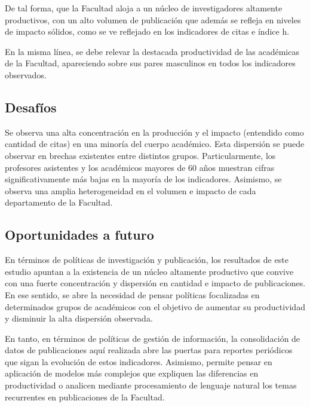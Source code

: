 \documentclass[
  spanish,
  a4paper,
  oneside]{scrbook}
\begin{document}
De tal forma, que la Facultad aloja a un núcleo de investigadores
altamente productivos, con un alto volumen de publicación que además se
refleja en niveles de impacto sólidos, como se ve reflejado en los
indicadores de citas e índice h.

En la misma línea, se debe relevar la destacada productividad de las
académicas de la Facultad, apareciendo sobre sus pares masculinos en
todos los indicadores observados.

\subsection*{Desafíos}\label{desafuxedos}

Se observa una alta concentración en la producción y el impacto
(entendido como cantidad de citas) en una minoría del cuerpo académico.
Esta dispersión se puede observar en brechas existentes entre distintos
grupos. Particularmente, los profesores asistentes y los académicos
mayores de 60 años muestran cifras significativamente más bajas en la
mayoría de los indicadores. Asimismo, se observa una amplia
heterogeneidad en el volumen e impacto de cada departamento de la
Facultad.

\subsection*{Oportunidades a futuro}\label{oportunidades-a-futuro}

En términos de políticas de investigación y publicación, los resultados
de este estudio apuntan a la existencia de un núcleo altamente
productivo que convive con una fuerte concentración y dispersión en
cantidad e impacto de publicaciones. En ese sentido, se abre la
necesidad de pensar políticas focalizadas en determinados grupos de
académicos con el objetivo de aumentar su productividad y disminuir la
alta dispersión observada.

En tanto, en términos de políticas de gestión de información, la
consolidación de datos de publicaciones aquí realizada abre las puertas
para reportes periódicos que sigan la evolución de estos indicadores.
Asimismo, permite pensar en aplicación de modelos más complejos que
expliquen las diferencias en productividad o analicen mediante
procesamiento de lenguaje natural los temas recurrentes en publicaciones
de la Facultad.

\end{document}
